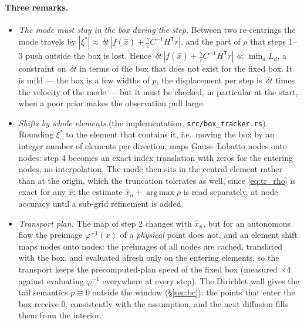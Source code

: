 \documentclass[11pt,a4paper]{article}
\newcommand{\argmax}{\operatorname{arg\,max}}
\newcommand{\T}{^{\mathsf T}}
\newcommand{\xh}{\hat{x}}
\newcommand{\eps}{\varepsilon}
\newcommand{\abs}[1]{\left\lvert #1 \right\rvert}
\newcommand{\dt}{\,\delta t}
\theoremstyle{plain}
\theoremstyle{definition}
\theoremstyle{remark}
\begin{document}
\paragraph{Three remarks.}
\begin{itemize}[leftmargin=1.5em]
  \item \emph{The mode must stay in the box during the step.} Between two re-centrings the mode travels by $\abs{\xi^*}\approx\dt\,\abs{f(\xh)+\tfrac\gamma\eps C^{-1}H\T r}$, and the part of $\rho$ that steps 1--3 push outside the box is lost. Hence $\dt\,\abs{f(\xh)+\tfrac\gamma\eps C^{-1}H\T r}\ll\min_dL_d$, a constraint on $\dt$ in terms of the box that does not exist for the fixed box. It is mild --- the box is a few widths of $p$, the displacement per step is $\dt$ times the velocity of the mode --- but it must be checked, in particular at the start, when a poor prior makes the observation pull large.
  \item \emph{Shifts by whole elements} (the implementation, \texttt{src/box\_tracker.rs}). Rounding $\xi^*$ to the element that contains it, i.e.\ moving the box by an integer number of elements per direction, maps Gauss--Lobatto nodes onto nodes: step 4 becomes an exact index translation with zeros for the entering nodes, no interpolation. The mode then sits in the central element rather than at the origin, which the truncation tolerates as well, since \eqref{eq:tr_rho} is exact for any $\xh$; the estimate $\xh_n+\argmax\rho$ is read separately, at node accuracy until a sub-grid refinement is added.
  \item \emph{Transport plan.} The map of step 2 changes with $\xh_n$, but for an autonomous flow the preimage $\varphi^{-1}(x)$ of a \emph{physical} point does not, and an element shift maps nodes onto nodes: the preimages of all nodes are cached, translated with the box, and evaluated afresh only on the entering elements, so the transport keeps the precomputed-plan speed of the fixed box (measured $\times4$ against evaluating $\varphi^{-1}$ everywhere at every step). The Dirichlet wall gives the tail semantics $p\equiv0$ outside the window (\S\ref{sec:bc}): the points that enter the box receive $0$, consistently with the assumption, and the next diffusion fills them from the interior.
\end{itemize}
\end{document}

